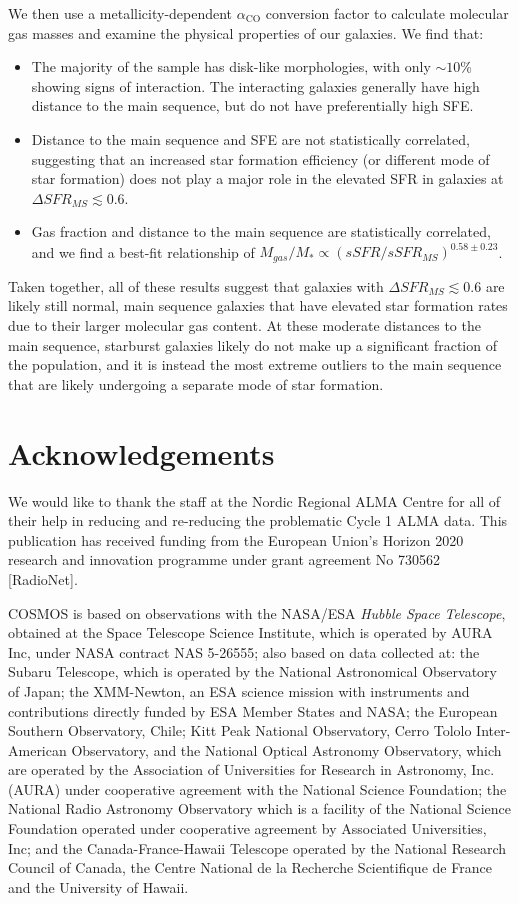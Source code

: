 \documentclass[a4paper,fleqn,usenatbib]{mnras}
\newcommand{\aco}{\alpha_{\mathrm{CO}}}
\begin{document}
We then use a metallicity-dependent $\aco$ conversion factor to calculate molecular gas masses and examine the physical properties of our galaxies. We find that:
 \begin{itemize}
 \item The majority of the sample has disk-like morphologies, with only $\sim 10$\% showing signs of interaction. The interacting galaxies generally have high distance to the main sequence, but do not have preferentially high SFE. 
 \item Distance to the main sequence and SFE are not statistically correlated, suggesting that an increased star formation efficiency (or different mode of star formation) does not play a major role in the elevated SFR in galaxies at $\Delta SFR_{MS} \lesssim 0.6$. 
 \item Gas fraction and distance to the main sequence are statistically correlated, and we find a best-fit relationship of $M_{gas} / M_{*} \propto (sSFR/sSFR_{MS})^{0.58 \pm 0.23}$. 
 \end{itemize}

Taken together, all of these results suggest that galaxies with $\Delta SFR_{MS}  \lesssim 0.6$ are likely still normal, main sequence galaxies that have elevated star formation rates due to their larger molecular gas content.  At these moderate distances to the main sequence, starburst galaxies likely do not make up a significant fraction of the population, and it is instead the most extreme outliers to the main sequence that are likely undergoing a separate mode of star formation. 


\section{Acknowledgements}

We would like to thank the staff at the Nordic Regional ALMA Centre for all of their help in reducing and re-reducing the problematic Cycle 1 ALMA data. 
This publication has received funding from the European Union's Horizon 2020 research and innovation programme under grant agreement No 730562 [RadioNet]. 

COSMOS is based on observations with the NASA/ESA {\em Hubble Space
Telescope}, obtained at the Space Telescope Science Institute, which
is operated by AURA Inc, under NASA contract NAS 5-26555; also based
on data collected at: the Subaru Telescope, which is operated by the
National Astronomical Observatory of Japan; the XMM-Newton, an ESA
science mission with instruments and contributions directly funded by
ESA Member States and NASA; the European Southern Observatory, Chile;
Kitt Peak National Observatory, Cerro Tololo Inter-American
Observatory, and the National Optical Astronomy Observatory, which are
operated by the Association of Universities for Research in Astronomy,
Inc. (AURA) under cooperative agreement with the National Science
Foundation; the National Radio Astronomy Observatory which is a
facility of the National Science Foundation operated under cooperative
agreement by Associated Universities, Inc; and the
Canada-France-Hawaii Telescope operated by the National Research
Council of Canada, the Centre National de la Recherche Scientifique de
France and the University of Hawaii.
\end{document}
